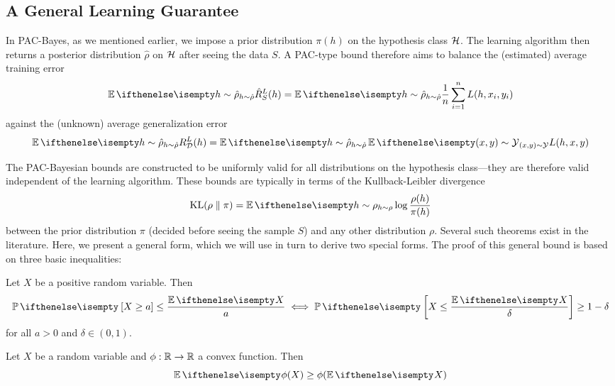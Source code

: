 \subsection{A General Learning Guarantee}

In PAC-Bayes, as we mentioned earlier, we impose a prior distribution $\pi(h)$
on the hypothesis class $\mathcal{H}$. The learning algorithm then returns a posterior
distribution $\hat{\rho}$ on $\mathcal{H}$ after seeing the data $S$. A PAC-type bound
therefore aims to balance the (estimated) average training error
\begin{equation}
  \Ev[h \sim \hat{\rho}]{\hat{R}_S^L(h)} = \Ev[h \sim \hat{\rho}]{\frac{1}{n}
  \sum_{i = 1}^n L(h, x_i, y_i)}
\end{equation}
against the (unknown) average generalization error
\begin{equation}
  \Ev[h \sim \hat{\rho}]{R_\CD^L(h)} = \Ev[h \sim \hat{\rho}]{\Ev[(x, y) \sim
  \CY]{L(h, x, y)}}
\end{equation}

The PAC-Bayesian bounds are constructed to be uniformly valid for all
distributions on the hypothesis class---they are therefore valid independent of
the learning algorithm. These bounds are typically in terms of the
Kullback-Leibler divergence
\begin{equation}
  \KL{\rho}{\pi} = \Ev[h \sim \rho]{\log\frac{\rho(h)}{\pi(h)}}
\end{equation}
between the prior distribution $\pi$ (decided before seeing the sample $S$) and
any other distribution $\rho$. Several such theorems exist in the literature.
Here, we present a general form, which we will use in turn to derive two special
forms. The proof of this general bound is based on three basic inequalities:

\begin{lemma}
  Let $X$ be a positive random variable. Then
  \begin{equation}
    \Pr{X \geq a} \leq \frac{\Ev{X}}{a} \iff \Pr{X \leq \frac{\Ev{X}}{\delta}}
    \geq 1 - \delta
  \end{equation}
  for all $a > 0$ and $\delta \in (0, 1)$.
\end{lemma}

\begin{lemma}
  Let $X$ be a random variable and $\phi : \mathbb{R} \to \mathbb{R}$ a convex function. Then
  \begin{equation}
    \Ev{\phi(X)} \geq \phi(\Ev{X})
  \end{equation}
\end{lemma}

